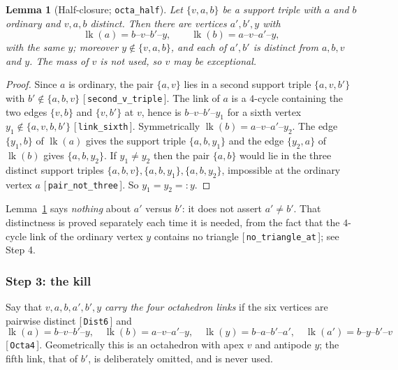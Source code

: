 \documentclass[11pt,reqno]{amsart}
\newcommand{\leanref}[1]{\textup{[\,\texttt{#1}\,]}}
\theoremstyle{plain}
\newtheorem{lemma}[theorem]{Lemma}
\theoremstyle{definition}
\numberwithin{theorem}{section}
\newcommand{\lk}{\operatorname{lk}}
\begin{document}
\begin{lemma}[Half-closure; \texttt{octa\_half}]\label{lem:octahalf}
Let $\{v,a,b\}$ be a support triple with $a$ and $b$ ordinary and $v, a, b$ distinct. Then there
are vertices $a', b', y$ with
\[
  \lk(a) = b\text{--}v\text{--}b'\text{--}y, \qquad \lk(b) = a\text{--}v\text{--}a'\text{--}y,
\]
with the \emph{same} $y$; moreover $y \notin \{v,a,b\}$, and each of $a', b'$ is distinct from
$a, b, v$ and $y$. The mass of $v$ is not used, so $v$ may be exceptional.
\end{lemma}

\begin{proof}
Since $a$ is ordinary, the pair $\{a,v\}$ lies in a second support triple $\{a,v,b'\}$ with
$b' \notin \{a,b,v\}$ \leanref{second\_v\_triple}. The link of $a$ is a $4$-cycle containing the
two edges $\{v,b\}$ and $\{v,b'\}$ at $v$, hence is $b$--$v$--$b'$--$y_1$ for a sixth vertex
$y_1 \notin \{a,v,b,b'\}$ \leanref{link\_sixth}. Symmetrically $\lk(b) = a$--$v$--$a'$--$y_2$.
The edge $\{y_1,b\}$ of $\lk(a)$ gives the support triple $\{a,b,y_1\}$ and the edge
$\{y_2,a\}$ of $\lk(b)$ gives $\{a,b,y_2\}$. If $y_1 \ne y_2$ then the pair $\{a,b\}$ would lie
in the three distinct support triples $\{a,b,v\}, \{a,b,y_1\}, \{a,b,y_2\}$, impossible at the
ordinary vertex $a$ \leanref{pair\_not\_three}. So $y_1 = y_2 =: y$.
\end{proof}

Lemma~\ref{lem:octahalf} says \emph{nothing} about $a'$ versus $b'$: it does not assert
$a' \ne b'$. That distinctness is proved separately each time it is needed, from the fact that
the $4$-cycle link of the ordinary vertex $y$ contains no triangle \leanref{no\_triangle\_at};
see Step 4.

\subsubsection*{Step 3: the kill}

Say that $v, a, b, a', b', y$ \emph{carry the four octahedron links} if the six vertices are
pairwise distinct \leanref{Dist6} and
\begin{equation}\label{eq:octa4}
  \lk(a) = b\text{--}v\text{--}b'\text{--}y, \quad \lk(b) = a\text{--}v\text{--}a'\text{--}y,
  \quad \lk(y) = b\text{--}a\text{--}b'\text{--}a', \quad
  \lk(a') = b\text{--}y\text{--}b'\text{--}v
\end{equation}
\leanref{Octa4}. Geometrically this is an octahedron with apex $v$ and antipode $y$; the fifth
link, that of $b'$, is deliberately omitted, and is never used.
\end{document}
